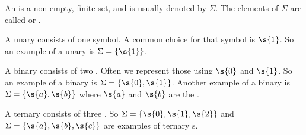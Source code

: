 \begin{flex}
\begin{definition} \label{definition:Alphabet-symbol-character}
An  is a non-empty, finite set, and is usually denoted by $\Sigma$. 
The elements of $\Sigma$ are called  or .
\end{definition}

\begin{example} \label{example:Unary-alphabet}
A unary  consists of one symbol. A common choice for that symbol is $\s{1}$. 
So an example of a unary  is $\Sigma = \{\s{1}\}$.
\end{example}

\begin{example} \label{example:Binary-alphabet}
A binary  consists of two . 
Often we represent those  using $\s{0}$ and $\s{1}$. 
So an example of a binary  is $\Sigma = \{\s{0},\s{1}\}$.
Another example of a binary  is $\Sigma=\{\s{a},\s{b}\}$ where $\s{a}$ and $\s{b}$ are the .
\end{example}

\begin{example} \label{example:Ternary-alphabet}
A ternary  consists of three . 
So $\Sigma=\{\s{0},\s{1},\s{2}\}$ and $\Sigma=\{\s{a},\s{b},\s{c}\}$ are examples of ternary s. 
\end{example}
\end{flex}


